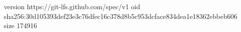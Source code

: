 version https://git-lfs.github.com/spec/v1
oid sha256:30d105393def23e3c76dfec16c378d8b5c953dcface834dea1e18362ebbeb606
size 174916
